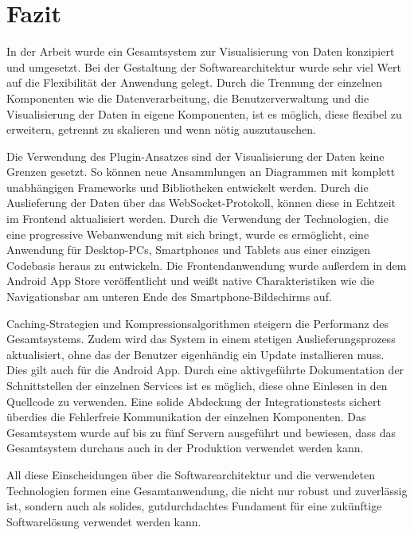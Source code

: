 \chapter{Fazit}
\label{chap:fazit}

In der Arbeit wurde ein Gesamtsystem zur Visualisierung von Daten konzipiert und
umgesetzt. Bei der Gestaltung der Softwarearchitektur wurde sehr viel Wert auf
die Flexibilität der Anwendung gelegt. Durch die Trennung der einzelnen Komponenten
wie die Datenverarbeitung, die Benutzerverwaltung und die Visualisierung der Daten
in eigene Komponenten, ist es möglich, diese flexibel zu erweitern,
getrennt zu skalieren und wenn nötig auszutauschen. 

Die Verwendung des Plugin-Ansatzes sind der Visualisierung der Daten keine Grenzen gesetzt.
So können neue Ansammlungen an Diagrammen mit komplett unabhängigen Frameworks und
Bibliotheken entwickelt werden. Durch die Auslieferung der Daten über
das WebSocket-Protokoll, können diese in Echtzeit im Frontend aktualisiert werden.
Durch die Verwendung der Technologien, die eine progressive Webanwendung mit sich bringt,
wurde es ermöglicht, eine Anwendung für Desktop-PCs, Smartphones und Tablets aus einer einzigen
Codebasis heraus zu entwickeln. Die Frontendanwendung wurde außerdem in dem Android App Store
veröffentlicht und weißt native Charakteristiken wie die Navigationsbar am unteren
Ende des Smartphone-Bildschirms auf. 

Caching-Strategien und Kompressionsalgorithmen steigern die Performanz des Gesamtsystems.
Zudem wird das System in einem stetigen Auslieferungsprozess aktualisiert, ohne das
der Benutzer eigenhändig ein Update installieren muss. Dies gilt auch für die Android App.
Durch eine aktivgeführte Dokumentation der Schnittstellen der einzelnen Services
ist es möglich, diese ohne Einlesen in den Quellcode zu verwenden. Eine solide Abdeckung der Integrationstests sichert überdies die
Fehlerfreie Kommunikation der einzelnen Komponenten. Das Gesamtsystem wurde auf bis zu
fünf Servern ausgeführt und bewiesen, dass das Gesamtsystem durchaus auch in der Produktion
verwendet werden kann.

All diese Einscheidungen über die Softwarearchitektur und die verwendeten Technologien
formen eine Gesamtanwendung, die nicht nur robust und zuverlässig ist, sondern auch
als solides, gutdurchdachtes Fundament für eine zukünftige Softwarelösung
verwendet werden kann.
